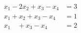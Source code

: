 \begin{align*}
x_1 - 2x_2 + x_3 - x_4 &= 3\\
x_1 + x_2 + x_3 - x_4 &= 1\\
x_1 \quad + x_3 - x_4 &= 2
\end{align*}